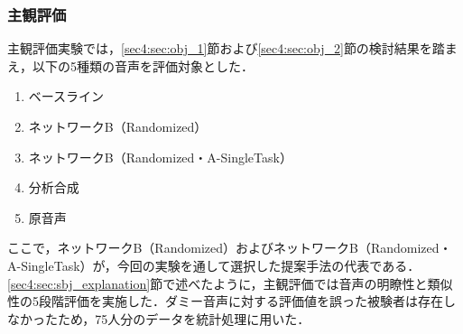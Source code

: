 \begin{table}[bt]
    \centering
    \caption{ネットワークB（Randomized・A-SingleTask）かつ$\lossWeightHubDisc = 0.1$の場合における学習済み重みでネットワークAとネットワークBを初期化し，1度に学習させた場合の比較}
    \label{sec4:tab:obj_weights_e2e_pretrained}
    \begin{center}
        \renewcommand{\arraystretch}{1.0} %
        \setlength{\tabcolsep}{8pt}      %
    \end{center}
\end{table}

\subsubsection{主観評価}
主観評価実験では，\ref{sec4:sec:obj_1}節および\ref{sec4:sec:obj_2}節の検討結果を踏まえ，以下の5種類の音声を評価対象とした．
\begin{enumerate}
    \item ベースライン
    \item ネットワークB（Randomized）
    \item ネットワークB（Randomized・A-SingleTask）
    \item 分析合成
    \item 原音声
\end{enumerate}
ここで，ネットワークB（Randomized）およびネットワークB（Randomized・A-SingleTask）が，今回の実験を通して選択した提案手法の代表である．\ref{sec4:sec:sbj_explanation}節で述べたように，主観評価では音声の明瞭性と類似性の5段階評価を実施した．ダミー音声に対する評価値を誤った被験者は存在しなかったため，75人分のデータを統計処理に用いた．


